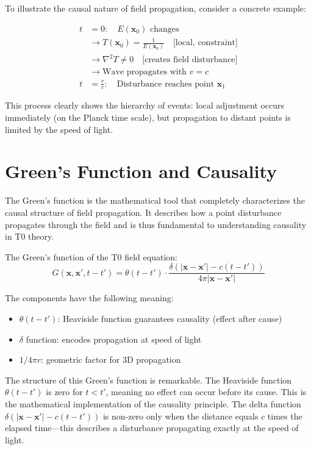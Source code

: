 \documentclass[12pt,a4paper]{article}
\begin{document}
	To illustrate the causal nature of field propagation, consider a concrete example:
	
	\begin{align}
		t &= 0: \quad E(\mathbf{x}_0) \text{ changes} \\
		&\rightarrow T(\mathbf{x}_0) = \frac{1}{E(\mathbf{x}_0)} \quad \text{[local, constraint]} \\
		&\rightarrow \nabla^2 T \neq 0 \quad \text{[creates field disturbance]} \\
		&\rightarrow \text{Wave propagates with } v = c \\
		t &= \frac{r}{c}: \quad \text{Disturbance reaches point } \mathbf{x}_1
	\end{align}
	
	This process clearly shows the hierarchy of events: local adjustment occurs immediately (on the Planck time scale), but propagation to distant points is limited by the speed of light.
	
	\section{Green's Function and Causality}
	
	The Green's function is the mathematical tool that completely characterizes the causal structure of field propagation. It describes how a point disturbance propagates through the field and is thus fundamental to understanding causality in T0 theory.
	
	The Green's function of the T0 field equation:
	\begin{equation}
		G(\mathbf{x},\mathbf{x}',t-t') = \theta(t-t') \cdot \frac{\delta(|\mathbf{x}-\mathbf{x}'| - c(t-t'))}{4\pi|\mathbf{x}-\mathbf{x}'|} \label{eq:green}
	\end{equation}
	
	The components have the following meaning:
	\begin{itemize}
		\item $\theta(t-t')$: Heaviside function guarantees causality (effect after cause)
		\item $\delta$ function: encodes propagation at speed of light
		\item $1/4\pi r$: geometric factor for 3D propagation
	\end{itemize}
	
	The structure of this Green's function is remarkable. The Heaviside function $\theta(t-t')$ is zero for $t < t'$, meaning no effect can occur before its cause. This is the mathematical implementation of the causality principle. The delta function $\delta(|\mathbf{x}-\mathbf{x}'| - c(t-t'))$ is non-zero only when the distance equals $c$ times the elapsed time—this describes a disturbance propagating exactly at the speed of light.
	
\end{document}
